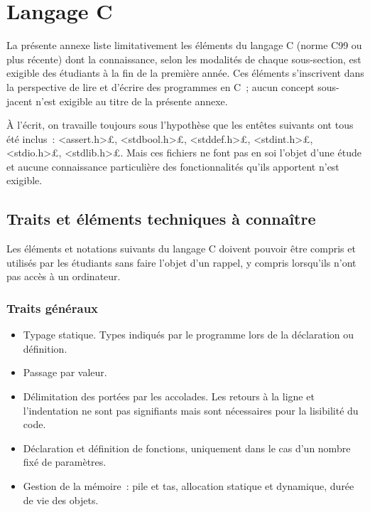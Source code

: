\section{Langage C}
La présente annexe liste limitativement les éléments du langage C (norme C99 ou plus récente) dont la connaissance, selon les modalités de chaque sous-section, est exigible des étudiants à la fin de la première année. Ces éléments s'inscrivent dans la perspective de lire et d'écrire des programmes en C~; aucun concept sous-jacent n'est exigible au titre de la présente annexe.

À l'écrit, on travaille toujours sous l'hypothèse que les entêtes suivants ont tous été inclus~: \£<assert.h>£, \£<stdbool.h>£, \£<stddef.h>£, \£<stdint.h>£, \£<stdio.h>£, \£<stdlib.h>£. Mais ces fichiers ne font pas en soi l'objet d'une étude et aucune connaissance particulière des fonctionnalités qu'ils apportent n'est exigible.

\subsection{Traits et éléments techniques à connaître}
Les éléments et notations suivants du langage C doivent pouvoir être compris et utilisés par les étudiants sans faire l'objet d'un rappel, y compris lorsqu'ils n'ont pas accès à un ordinateur.

\subsubsection*{Traits généraux}
\begin{itemize}
\item Typage statique. Types indiqués par le programme lors de la déclaration ou définition.
\item Passage par valeur.
\item Délimitation des portées par les accolades. Les retours à la ligne et l'indentation ne sont pas signifiants mais sont nécessaires pour la lisibilité du code.
\item Déclaration et définition de fonctions, uniquement dans le cas d'un nombre fixé de paramètres.
\item Gestion de la mémoire~: pile et tas, allocation statique et dynamique, durée de vie des objets.
\end{itemize}

